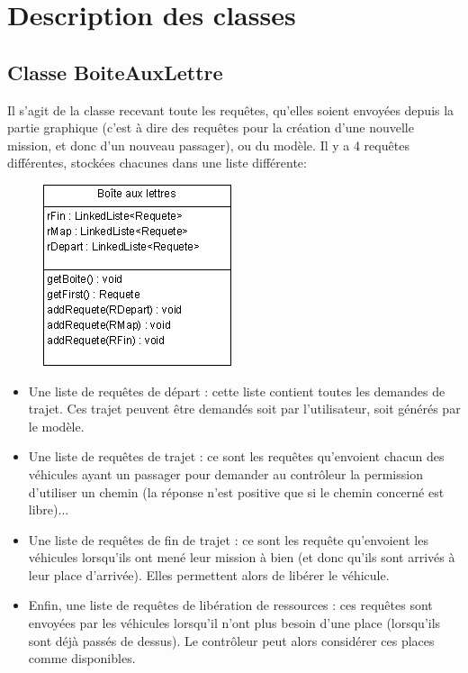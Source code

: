 \documentclass[a4paper, titlepage]{report}
\begin{document}
\chapter{Description des classes}
\section{Classe BoiteAuxLettre}
     
      Il s'agit de la classe recevant toute les requêtes, qu'elles soient envoyées depuis la partie graphique (c'est à dire des requêtes pour la création d'une nouvelle mission, et donc d'un nouveau passager), ou du modèle. Il y a 4 requêtes différentes, stockées chacunes dans une liste différente:
      \begin{figure}
\includegraphics[scale=1]{Images/BoiteAuxLettre.PNG}
\end{figure}   
      \begin{itemize}
      \item Une liste de requêtes de départ : cette liste contient toutes les demandes de trajet. Ces trajet peuvent être demandés soit par l'utilisateur, soit générés par le modèle.
      \item Une liste de requêtes de trajet : ce sont les requêtes qu'envoient chacun des véhicules ayant un passager pour demander au contrôleur la permission d'utiliser un chemin (la réponse n'est positive que si le chemin concerné est libre)...
      \item Une liste de requêtes de fin de trajet : ce sont les requête qu'envoient les véhicules lorsqu'ils ont mené leur mission à bien (et donc qu'ils sont arrivés à leur place d'arrivée). Elles permettent alors de libérer le véhicule.
      \item Enfin, une liste de requêtes de libération de ressources : ces requêtes sont envoyées par les véhicules lorsqu'il n'ont plus besoin d'une place (lorsqu'ils sont déjà passés de dessus). Le contrôleur peut alors considérer ces places comme disponibles.
      \end{itemize}
\end{document}
